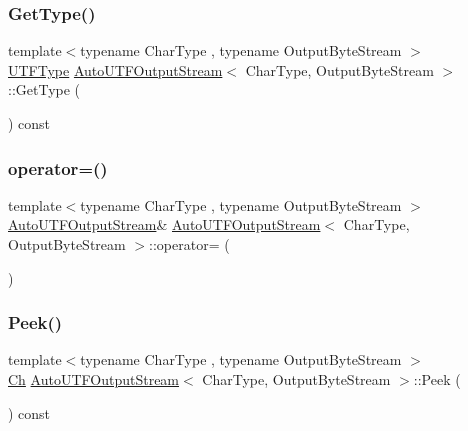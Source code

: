 \subsubsection{\texorpdfstring{Get\+Type()}{GetType()}}
{\footnotesize\ttfamily template$<$typename Char\+Type , typename Output\+Byte\+Stream $>$ \\
\hyperlink{encodings_8h_ac9448aedf514a5bb509bae73a9ce4e58}{U\+T\+F\+Type} \hyperlink{classAutoUTFOutputStream}{Auto\+U\+T\+F\+Output\+Stream}$<$ Char\+Type, Output\+Byte\+Stream $>$\+::Get\+Type (\begin{DoxyParamCaption}{ }\end{DoxyParamCaption}) const\hspace{0.3cm}{\ttfamily [inline]}}

\mbox{\label{classAutoUTFOutputStream_a498613c6dcada9980fea3d6094f21215}} 
\subsubsection{\texorpdfstring{operator=()}{operator=()}}
{\footnotesize\ttfamily template$<$typename Char\+Type , typename Output\+Byte\+Stream $>$ \\
\hyperlink{classAutoUTFOutputStream}{Auto\+U\+T\+F\+Output\+Stream}\& \hyperlink{classAutoUTFOutputStream}{Auto\+U\+T\+F\+Output\+Stream}$<$ Char\+Type, Output\+Byte\+Stream $>$\+::operator= (\begin{DoxyParamCaption}\item[{const \hyperlink{classAutoUTFOutputStream}{Auto\+U\+T\+F\+Output\+Stream}$<$ Char\+Type, Output\+Byte\+Stream $>$ \&}]{ }\end{DoxyParamCaption})\hspace{0.3cm}{\ttfamily [private]}}

\mbox{\label{classAutoUTFOutputStream_ad706f62fd5d22967e5949f3a05087e4e}} 
\subsubsection{\texorpdfstring{Peek()}{Peek()}}
{\footnotesize\ttfamily template$<$typename Char\+Type , typename Output\+Byte\+Stream $>$ \\
\hyperlink{classAutoUTFOutputStream_abd8c486101026e11828e86c18991c9c0}{Ch} \hyperlink{classAutoUTFOutputStream}{Auto\+U\+T\+F\+Output\+Stream}$<$ Char\+Type, Output\+Byte\+Stream $>$\+::Peek (\begin{DoxyParamCaption}{ }\end{DoxyParamCaption}) const\hspace{0.3cm}{\ttfamily [inline]}}


